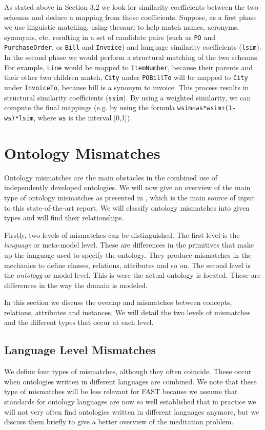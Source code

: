 As stated above in Section 3.2 we look for similarity coefficients
between the two schemas and deduce a mapping from those coefficients.
Suppose, as a first phase we use linguistic matching, using thesauri to
help match names, acronyms, synonyms, etc. resulting in a set of
candidate pairs (such as \texttt{PO} and
\texttt{PurchaseOrder}, or \texttt{Bill} and
\texttt{Invoice}) and language similarity coefficients
(\texttt{lsim}). In the second phase we would perform a
structural matching of the two schemas. For example,
\texttt{Line} would be mapped to
\texttt{ItemNumber}, because their parents and their other
two children match, \texttt{City} under
\texttt{POBillTo} will be mapped to
\texttt{City} under \texttt{InvoiceTo},
because bill is a synonym to invoice. This process results in
structural similarity coefficients (\texttt{ssim}). By
using a weighted similarity, we can compute the final mappings (e.g. by
using the formula \texttt{wsim=ws*wsim+(1-ws)*lsim}, where
\texttt{ws} is the interval [0,1]). 


\section{Ontology Mismatches}
\label{sec:ontologymismatches}
Ontology mismatches are the main obstacles in the combined use of
independently developed ontologies. We will now give an overview of the
main type of ontology mismatches as presented in \cite{klein2001combiningOntologies}, which
is the main source of input to this state-of-the-art report. We will
classify ontology mismatches into given types and will find their
relationships. 

Firstly, two levels of mismatches can be distinguished. The first level
is the \textit{language} or meta-model level. These are differences in
the primitives that make up the language used to specify the ontology.
They produce mismatches in the mechanics to define classes, relations,
attributes and so on. The second level is the \textit{ontology} or
model level. This is were the actual ontology is located. These are
differences in the way the domain is modeled. 

In this section we discuss the overlap and mismatches between concepts,
relations, attributes and instances. We will detail the two levels of
mismatches and the different types that occur at each level. 

\subsection{Language Level Mismatches}
\label{subsec:ontologymismatches_languagelevel}
We define four types of mismatches, although they often coincide. These
occur when ontologies written in different languages are combined. We
note that these type of mismatches will be less relevant for FAST
because we assume that standards for ontology languages are now so well
established that in practice we will not very often find ontologies
written in different languages anymore, but we discuss them briefly to
give a better overview of the meditation problem. 

